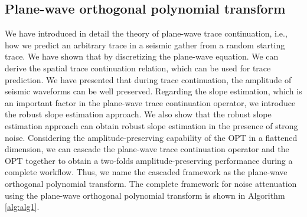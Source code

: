 



\subsection{Plane-wave orthogonal polynomial transform}
We have introduced in detail the theory of plane-wave trace continuation, i.e., how we predict an arbitrary trace in a seismic gather from a random starting trace. We have shown that by discretizing the plane-wave equation. We can derive the spatial trace continuation relation, which can be used for trace prediction. We have presented that during trace continuation, the amplitude of seismic waveforms can be well preserved. Regarding the slope estimation, which is an important factor in the plane-wave trace continuation operator, we introduce the robust slope estimation approach. We also show that the robust slope estimation approach can obtain robust slope estimation in the presence of strong noise. Considering the amplitude-preserving capability of the OPT in a flattened dimension, we can cascade the plane-wave trace continuation operator and the OPT together to obtain a two-folds amplitude-preserving performance during a complete workflow. Thus, we name the cascaded framework as the plane-wave orthogonal polynomial transform. The complete framework for noise attenuation using the plane-wave orthogonal polynomial transform is shown in Algorithm \ref{alg:alg1}. 

